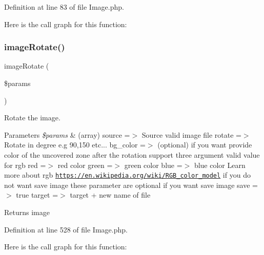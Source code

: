 Definition at line 83 of file Image.\+php.

Here is the call graph for this function\+:
\mbox{\label{class_zest_1_1_image_1_1_image_a762c46642966686a6d012387b142b117}} 
\subsubsection{\texorpdfstring{image\+Rotate()}{imageRotate()}}
{\footnotesize\ttfamily image\+Rotate (\begin{DoxyParamCaption}\item[{}]{\$params }\end{DoxyParamCaption})}

Rotate the image.


\begin{DoxyParams}{Parameters}
{\em \$params} & (array) \textquotesingle{}source\textquotesingle{} =$>$ Source valid image file \textquotesingle{}rotate\textquotesingle{} =$>$ Rotate in degree e.\+g 90,150 etc... \textquotesingle{}bg\+\_\+color\textquotesingle{} =$>$ (optional) if you want provide color of the uncovered zone after the rotation support three argument valid value for rgb \textquotesingle{}red\textquotesingle{} =$>$ red color \textquotesingle{}green\textquotesingle{} =$>$ green color \textquotesingle{}blue\textquotesingle{} =$>$ blue color Learn more about rgb \href{https://en.wikipedia.org/wiki/RGB_color_model}{\tt https\+://en.\+wikipedia.\+org/wiki/\+R\+G\+B\+\_\+color\+\_\+model} if you do not want save image these parameter are optional if you want save image \textquotesingle{}save\textquotesingle{} =$>$ true \textquotesingle{}target\textquotesingle{} =$>$ target + new name of file\\
\hline
\end{DoxyParams}
\begin{DoxyReturn}{Returns}
image 
\end{DoxyReturn}


Definition at line 528 of file Image.\+php.

Here is the call graph for this function\+:
\mbox{\label{class_zest_1_1_image_1_1_image_a059243633a6de5f63a331aa0128de26a}} 
